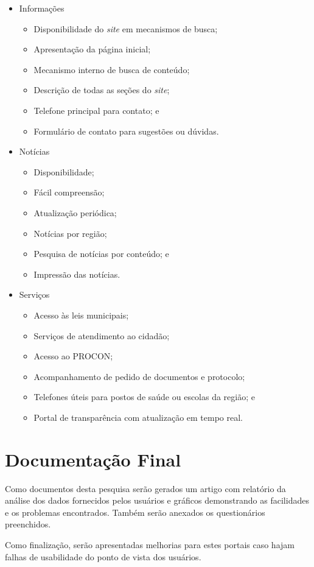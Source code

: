 \documentclass{article}
\begin{document}
\begin{itemize}
  \item Informações
  \begin{itemize}
    \item Disponibilidade do \textit{site} em mecanismos de busca;
    \item Apresentação da página inicial;
    \item Mecanismo interno de busca de conteúdo;
    \item Descrição de todas as seções do \textit{site};
    \item Telefone principal para contato; e
    \item Formulário de contato para sugestões ou dúvidas.
  \end{itemize}
  \item Notícias
  \begin{itemize}
    \item Disponibilidade;
    \item Fácil compreensão;
    \item Atualização periódica;
    \item Notícias por região;
    \item Pesquisa de notícias por conteúdo; e
    \item Impressão das notícias.
  \end{itemize}
  \item Serviços
  \begin{itemize}
    \item Acesso às leis municipais;
    \item Serviços de atendimento ao cidadão;
    \item Acesso ao PROCON;
    \item Acompanhamento de pedido de documentos e protocolo;
    \item Telefones úteis para postos de saúde ou escolas da região; e
    \item Portal de transparência com atualização em tempo real.
  \end{itemize}
\end{itemize}

\section{Documentação Final}

Como documentos desta pesquisa serão gerados um artigo com relatório da análise
dos dados fornecidos pelos usuários e gráficos demonstrando as facilidades e os
problemas encontrados. Também serão anexados os questionários preenchidos.

Como finalização, serão apresentadas melhorias para estes portais caso hajam
falhas de usabilidade do ponto de vista dos usuários.
\end{document}
